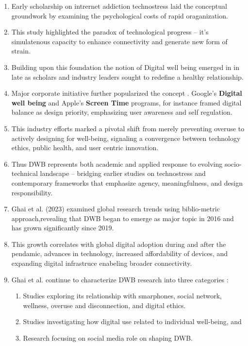 \documentclass[12pt]{article}
\begin{document}
\begin{enumerate}
    \item Early scholarship on intrernet addiction \cite{kraut1998internet} technostress \cite{tarafdar2007technostress} laid the conceptual groundwork by examining the psychological costs of rapid oraganization.
    \item This study highlighted the paradox of technological progress -- it's simulatenous capacity to enhance connectivity and generate new form of strain.
    \item Building upon this foundation the notion of Digital well being emerged in in late \cite{keshav2010} as scholars and industry leaders sought to redefine a healthy relationship.
    \item Major corporate initiative further popularized the concept . Google's \textbf{Digital well being} and Apple's \textbf{Screen Time} programs, for instance framed digital balance as design priority, emphasizing user awareness and self regulation.
    \item This industry efforts marked a pivotal shift from merely preventing overuse to actively designing for well-being, signaling a convergence between technology ethics, public health, and user centric innovation.
    \item Thus DWB represents both academic and applied response to evolving socio-technical landscape -- bridging earlier studies on technostress  and contemporary frameworks that emphasize agency, meaningfulness, and design responsibility.
    \item Ghai et al. (2023) \cite{ghai2023digital}  examined global research trends using biblio-metric approach,revealing that DWB began to emerge as major topic in 2016 and has grown significantly since 2019.
    \item This growth correlates with global digital adoption during and after the pendamic, advances in technology, increased affordability of devices, and expanding digital infrastruce enabeling broader connectivity.
    \item Ghai et al. continue to characterize DWB research into three categories :
    \begin{enumerate}
        \item Studies exploring its relationship with smarphones, social network, wellness, overuse and disconnection, and digital ethics. 
        \item Studies investigating how digital use related to individual well-being, and 
        \item Research focusing on social media role on shaping DWB.

\end{enumerate}
\end{enumerate}
\end{document}
